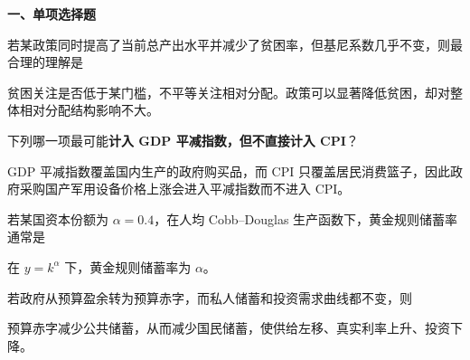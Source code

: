 ﻿


\textbf{一、单项选择题}

\begin{question}
若某政策同时提高了当前总产出水平并减少了贫困率，但基尼系数几乎不变，则最合理的理解是
\begin{choiceoptions}[1]
\end{choiceoptions}
\begin{solution}
贫困关注是否低于某门槛，不平等关注相对分配。政策可以显著降低贫困，却对整体相对分配结构影响不大。
\end{solution}
\end{question}

\begin{question}
下列哪一项最可能\textbf{计入 GDP 平减指数，但不直接计入 CPI}？
\begin{choiceoptions}[2]
\end{choiceoptions}
\begin{solution}
GDP 平减指数覆盖国内生产的政府购买品，而 CPI 只覆盖居民消费篮子，因此政府采购国产军用设备价格上涨会进入平减指数而不进入 CPI。
\end{solution}
\end{question}

\begin{question}
若某国资本份额为 $\alpha=0.4$，在人均 Cobb--Douglas 生产函数下，黄金规则储蓄率通常是
\begin{choiceoptions}[2]
\end{choiceoptions}
\begin{solution}
在 $y=k^{\alpha}$ 下，黄金规则储蓄率为 $\alpha$。
\end{solution}
\end{question}

\begin{question}
若政府从预算盈余转为预算赤字，而私人储蓄和投资需求曲线都不变，则
\begin{choiceoptions}[1]
\end{choiceoptions}
\begin{solution}
预算赤字减少公共储蓄，从而减少国民储蓄，使供给左移、真实利率上升、投资下降。
\end{solution}
\end{question}

